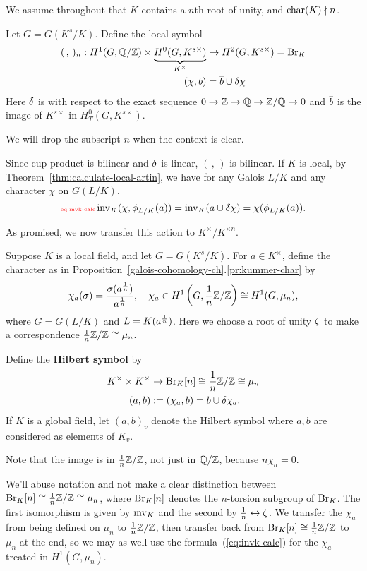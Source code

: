 We assume throughout that $K$ contains a $n$th root of unity, and $\operatorname{char}(K)\nmid n$.
\begin{df}
Let $G=G(K^s/K)$. 
Define the local symbol 
\begin{align*}(\,,\,)_n:H^1(G,\mathbb{Q}/\mathbb{Z})\times  \underbrace{H^0(G,K^{s\times})}_{K^{\times}}&\to H^2(G,K^{s\times})=\operatorname{Br}_K\\
(\chi,b)&=\overline{b}\cup \delta \chi
\end{align*}
Here $\delta$ is with respect to the exact sequence $0\to \mathbb{Z}\to \mathbb{Q}\to \mathbb{Z}/\mathbb{Q}\to 0$ and $\overline{b}$ is the image of $K^{s\times}$ in $H_T^0(G,K^{s\times})$.

We will drop the subscript $n$ when the context is clear.
\end{df}
Since cup product is bilinear and $\delta$ is linear, $(\,,\,)$ is bilinear.
If $K$ is local, by Theorem~\ref{thm:calculate-local-artin}, we have for any Galois $L/K$ and any character $\chi$ on $G(L/K)$,
\begin{equation}\llabel{eq:invk-calc}
\inv_K(\chi,\phi_{L/K}(a))=\inv_K(a\cup \de \chi)=\chi(\phi_{L/K}(a)).
\end{equation}

As promised, we now transfer this action to $K^{\times}/K^{\times n}$.
\begin{df}
Suppose $K$ is a local field, and let $G=G(K^s/K)$. %
For $a\in K^{\times}$, define the character as in Proposition~\ref{galois-cohomology-ch}.\ref{pr:kummer-char} by 
\[\chi_a(\sigma)=\frac{\sigma(a^{\frac{1}{n}})}{a^{\frac{1}{n}}},\quad \chi_a\in H^1\left( {G,\frac{1}{n}\mathbb{Z}/\mathbb{Z}} \right)\cong H^1(G,\mu_{n}),\]
where $G=G(L/K)$ and $L=K(a^{\frac{1}{n}})$.
Here we choose a root of unity $\zeta$ to make a correspondence $\frac{1}{n}\mathbb{Z}/\mathbb{Z}\cong \mu_n$.

Define the \textbf{Hilbert symbol} by 
\begin{align*}
K^{\times}\times K^{\times}&\to \operatorname{Br}_K[n]\cong \frac{1}{n}\mathbb{Z}/\mathbb{Z}\cong 
\mu_n\\
(a,b)&:=(\chi_a,b)=b\cup \delta \chi_a.
\end{align*}
If $K$ is a global field, let $(a,b)_v$ denote the Hilbert symbol where $a,b$ are considered as elements of $K_v$.
\end{df}
Note that the image is in $\frac{1}{n}\mathbb{Z}/\mathbb{Z}$, not just in $\mathbb{Q}/\mathbb{Z}$, because $n\chi_a=0$.

We'll abuse notation and not make a clear distinction between $ \operatorname{Br}_K[n]\cong\frac{1}{n}\mathbb{Z}/\mathbb{Z}\cong \mu_n$, where $\operatorname{Br}_K[n]$ denotes the $n$-torsion subgroup of $\operatorname{Br}_K$. The first isomorphism is given by $\operatorname{inv}_K$ and the second by $\frac{1}{n}\leftrightarrow \zeta$. We transfer the $\chi_a$ from being defined on $\mu_n$ to $\frac{1}{n}\mathbb{Z}/\mathbb{Z}$, then transfer back from $\operatorname{Br}_K[n]\cong \frac{1}{n}\mathbb{Z}/\mathbb{Z}$ to $\mu_n$ at the end, so we may as well use the formula~(\ref{eq:invk-calc}) for the $\chi_a$ treated in $H^1(G,\mu_{n})$.

